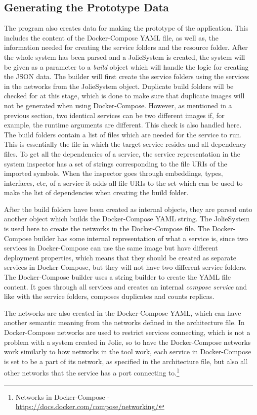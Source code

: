 \subsection{Generating the Prototype Data}
The \javatoolname[] program also creates data for making the prototype of the application. This includes the content of the Docker-Compose YAML file, as well as, the information needed for creating the service folders and the resource folder.
After the whole system has been parsed and a JolieSystem is created, the system will be given as a parameter to a \emph{build} object which will handle the logic for creating the JSON data.
The builder will first create the service folders using the services in the networks from the JolieSystem object. Duplicate build folders will be checked for at this stage, which is done to make sure that duplicate images will not be generated when using Docker-Compose.
However, as mentioned in a previous section, two identical services can be two different images if, for example, the runtime arguments are different. This check is also handled here.
The build folders contain a list of files which are needed for the service to run. This is essentially the file in which the target service resides and all dependency files.
To get all the dependencies of a service, the service representation in the system inspector has a set of strings corresponding to the file URIs of the imported symbols.
When the inspector goes through embeddings, types, interfaces, etc, of a service it adds all file URIs to the set which can be used to make the list of dependencies when creating the build folder.

After the build folders have been created as internal objects, they are parsed onto another object which builds the Docker-Compose YAML string. The JolieSystem is used here to create the networks in the Docker-Compose file.
The Docker-Compose builder has some internal representation of what a service is, since two services in Docker-Compose can use the same image but have different deployment properties, which means that they should be created as separate services in Docker-Compose, but they will not have two different service folders.
The Docker-Compose builder uses a string builder to create the YAML file content. It goes through all services and creates an internal \emph{compose service} and like with the service folders, composes duplicates and counts replicas.

The networks are also created in the Docker-Compose YAML, which can have another semantic meaning from the networks defined in the architecture file.
In Docker-Compose networks are used to restrict services connecting, which is not a problem with a system created in Jolie, so to have the Docker-Compose networks work similarly to how networks in the tool work, each service in Docker-Compose is set to be a part of
its network, as specified in the architecture file, but also all other networks that the service has a port connecting to.\footnote{Networks in Docker-Compose - \url{https://docs.docker.com/compose/networking/}}

